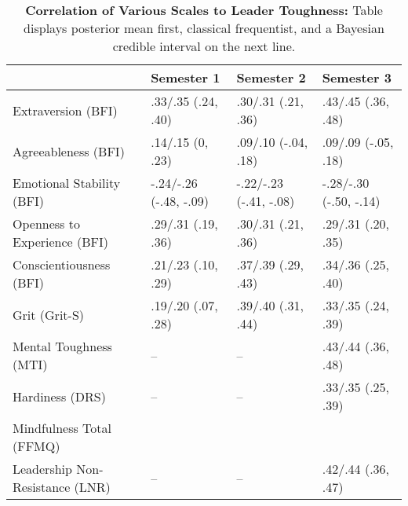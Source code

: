 \begin{table}[ht]
\centering
\begin{tabular}{llll}
  \hline
 & Semester 1 & Semester 2 & Semester 3 \\ 
  \hline
Extraversion (BFI) & .33/.35 (.24, .40) & .30/.31 (.21, .36) & .43/.45 (.36, .48) \\ 
  Agreeableness (BFI) & .14/.15 (0, .23) & .09/.10 (-.04, .18) & .09/.09 (-.05, .18) \\ 
  Emotional Stability (BFI) & -.24/-.26 (-.48, -.09) & -.22/-.23 (-.41, -.08) & -.28/-.30 (-.50, -.14) \\ 
  Openness to Experience (BFI) & .29/.31 (.19, .36) & .30/.31 (.21, .36) & .29/.31 (.20, .35) \\ 
  Conscientiousness (BFI) & .21/.23 (.10, .29) & .37/.39 (.29, .43) & .34/.36 (.25, .40) \\ 
  Grit (Grit-S) & .19/.20 (.07, .28) & .39/.40 (.31, .44) & .33/.35 (.24, .39) \\ 
  Mental Toughness (MTI) & -- & -- & .43/.44 (.36, .48) \\ 
  Hardiness (DRS) & -- & -- & .33/.35 (.25, .39) \\ 
  Mindfulness Total (FFMQ) &  &  &  \\ 
  Leadership Non-Resistance (LNR) & -- & -- & .42/.44 (.36, .47) \\ 
   \hline
\end{tabular}
\caption{\textbf{Correlation of Various Scales to Leader Toughness:} Table displays posterior mean first, classical frequentist, and a Bayesian credible interval on the next line.} 
\label{tab:pers_corr}
\end{table}
